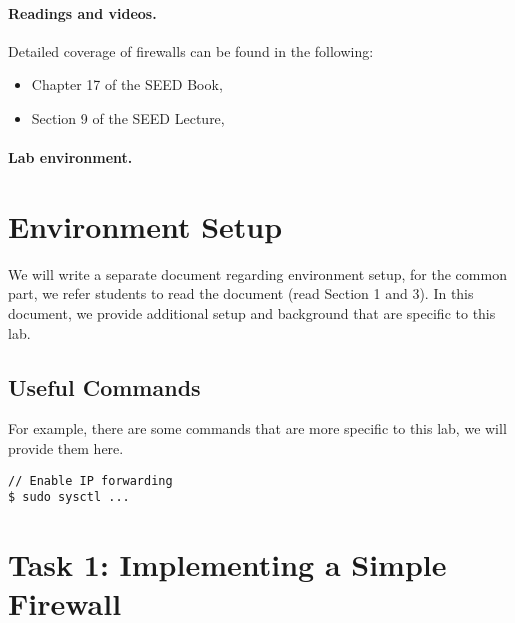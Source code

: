 \paragraph{Readings and videos.}
Detailed coverage of firewalls can be found in the following:

\begin{itemize}
\item Chapter 17 of the SEED Book, \seedbook
\item Section 9 of the SEED Lecture, \seedisvideo
\end{itemize}


\paragraph{Lab environment.} \seedenvironmentB




\section{Environment Setup}


We will write a separate document regarding environment
setup, for the common part, we refer students to 
read the document (read Section 1 and 3). 
In this document, we provide additional setup and 
background that are specific to this lab. 


\subsection{Useful Commands}

For example, there are some commands that are more specific
to this lab, we will provide them here. 


\begin{lstlisting}
// Enable IP forwarding 
$ sudo sysctl ...
\end{lstlisting}
 



 




\section{Task 1: Implementing a Simple Firewall} 


